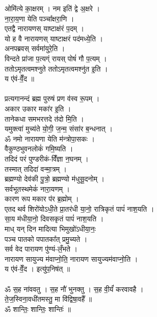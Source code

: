 ओमि॑त्ये का॒क्षरम् । नम इति॑ द्वे अ॒क्षरे ।\\
ना॒रा॒य॒णा येति पञ्चा᳚क्षरा॒णि ।\\
एतद्वै नारायणस् याष्टाक्ष॑रं प॒दम् ।\\
यो ह वै नारायणस् याष्टाक्षरं पद॑मध्ये॒ति ।\\
अनपब्रवस् सर्वमा॑युरे॒ति ।\\
विन्दते प्रा॑जा प॒त्यग्ं रायस् पोषं॑ गौ प॒त्यम् ।\\
ततोऽमृतत्वमश्नुते ततोऽमृतत्वमश्नु॑त इ॒ति ।\\
य ए॑वं-वेँ॒द ॥\\
\\
प्रत्यगानन्दं ब्रह्म पुरुषं प्रण व॑स्व रू॒पम् ।\\
अकार उकार मका॑र इ॒ति ।\\
तानेकधा समभरत्तदे त॑दो मि॒ति ।\\
यमुक्त्वा॑ मुच्य॑ते यो॒गी॒ ज॒न्म॒ संसा॑र ब॒न्धनात् ।\\
ॐ नमो नारायणा येति म॑न्त्रोपा॒सकः ।\\
वैकुण्ठभुवनलोकं॑ गमि॒ष्यति ।\\
तदिदं परं पुण्डरीकं-विँ॑ज्ञा न॒घनम् ।\\
तस्मात् तदिदा॑ वन्मा॒त्रम् ।\\
ब्रह्मण्यो देव॑की पु॒त्रो॒ ब्रह्मण्यो म॑धुसू॒दनोम् ।\\
सर्वभूतस्थमेकं॑ नारा॒यणम् ।\\
कारण रूप मकार प॑र ब्र॒ह्मोम् ।\\
एतद थर्व शिरो॑योऽधी॒ते प्रा॒तर॑धी या॒नो॒ रात्रिकृतं पापं॑ नाश॒यति ।\\
सा॒य म॑धीया॒नो॒ दिवसकृतं पापं॑ नाश॒यति ।\\
माध् यन् दिन मादित्या भिमुखो॑ऽधीया॒नः॒ \\
पञ्च पातको पपातका᳚त् प्रमु॒च्यते ।\\
सर्व वेद पारायण पु॑ण्यं-लँ॒भते ।\\
नारायण सायुज्य म॑वाप्नो॒ति॒ नारायण सायुज्यम॑वाप्नो॒ति ।\\
य ए॑वं-वेँ॒द । इत्यु॑प॒निष॑त् ॥\\
\\
ॐ स॒ह ना॑ववतु । स॒ह नौ॑ भुनक्तु । स॒ह वी॒र्यं॑ करवावहै ।\\
ते॒ज॒स्विना॒वधी॑तमस्तु॒ मा वि॑द्विषा॒वहै᳚ ॥\\
ॐ शान्तिः॒ शान्तिः॒ शान्तिः॑ ॥\\
